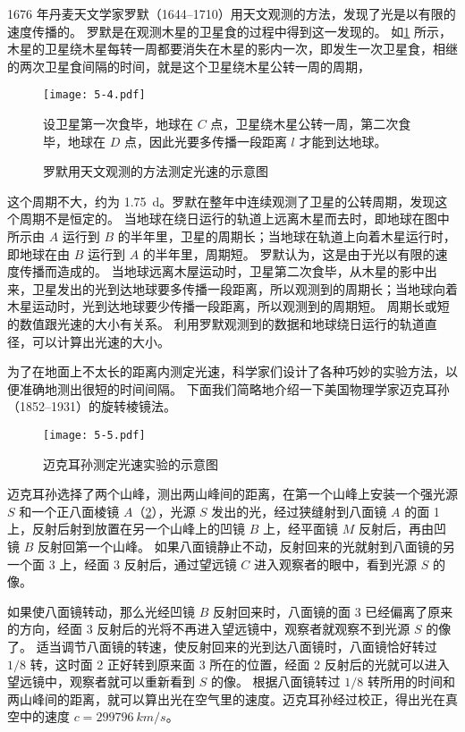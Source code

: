 1676 年丹麦天文学家罗默（1644--1710）用天文观测的方法，发现了光是以有限的速度传播的。
罗默是在观测木星的卫星食的过程中得到这一发现的。
如\cref{fig:5-4} 所示，木星的卫星绕木星每转一周都要消失在木星的影内一次，即发生一次卫星食，相继的两次卫星食间隔的时间，就是这个卫星绕木星公转一周的周期，
\begin{figure}
  \begin{minipage}{0.7\linewidth}\centering
    \texttt{[image: 5-4.pdf]}
  \end{minipage}%
  \begin{minipage}{0.3\linewidth}
    {\par\footnotesize 设卫星第一次食毕，地球在 $C$ 点，卫星绕木星公转一周，第二次食毕，地球在 $D$ 点，因此光要多传播一段距离 $l$ 才能到达地球。}
  \end{minipage}
  \caption{罗默用天文观测的方法测定光速的示意图}\label{fig:5-4}
\end{figure}
这个周期不大，约为 \qty{1.75}{d}。罗默在整年中连续观测了卫星的公转周期，发现这个周期不是恒定的。
当地球在绕日运行的轨道上远离木星而去时，即地球在图中所示由 $A$ 运行到 $B$ 的半年里，卫星的周期长；当地球在轨道上向着木星运行时，即地球在由 $B$ 运行到 $A$ 的半年里，周期短。
罗默认为，这是由于光以有限的速度传播而造成的。
当地球远离木屋运动时，卫星第二次食毕，从木星的影中出来，卫星发出的光到达地球要多传播一段距离，所以观测到的周期长；当地球向着木星运动时，光到达地球要少传播一段距离，所以观测到的周期短。
周期长或短的数值跟光速的大小有关系。
利用罗默观测到的数据和地球绕日运行的轨道直径，可以计算出光速的大小。

为了在地面上不太长的距离内测定光速，科学家们设计了各种巧妙的实验方法，以便准确地测出很短的时间间隔。
下面我们简略地介绍一下美国物理学家迈克耳孙（1852--1931）的旋转棱镜法。
\begin{figure}
  \texttt{[image: 5-5.pdf]}
  \caption{迈克耳孙测定光速实验的示意图}\label{fig:5-5}
\end{figure}

迈克耳孙选择了两个山峰，测出两山峰间的距离，在第一个山峰上安装一个强光源 $S$ 和一个正八面棱镜 $A$（\cref{fig:5-5}），光源 $S$ 发出的光，经过狭缝射到八面镜 $A$ 的面 1 上，反射后射到放置在另一个山峰上的凹镜 $B$ 上，经平面镜 $M$ 反射后，再由凹镜 $B$ 反射回第一个山峰。
如果八面镜静止不动，反射回来的光就射到八面镜的另一个面 3 上，经面 3 反射后，通过望远镜 $C$ 进入观察者的眼中，看到光源 $S$ 的像。

如果使八面镜转动，那么光经凹镜 $B$ 反射回来时，八面镜的面 3 已经偏离了原来的方向，经面 3 反射后的光将不再进入望远镜中，观察者就观察不到光源 $S$ 的像了。
适当调节八面镜的转速，使反射回来的光到达八面镜时，八面镜恰好转过 $1/8$ 转，这时面 2 正好转到原来面 3 所在的位置，经面 2 反射后的光就可以进入望远镜中，观察者就可以重新看到 $S$ 的像。
根据八面镜转过 $1/8$ 转所用的时间和两山峰间的距离，就可以算出光在空气里的速度。迈克耳孙经过校正，得出光在真空中的速度 $c=\qty{299796}{km/s}$。

